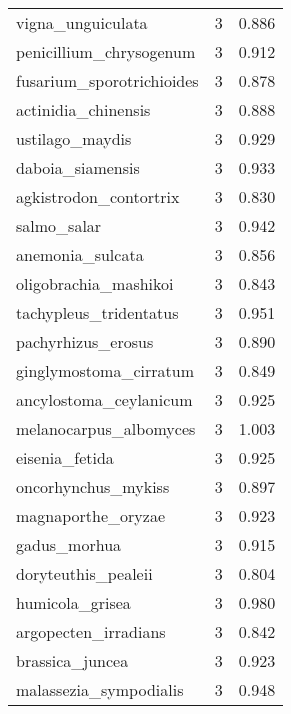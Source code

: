 \begin{tabular}{lrr}
              vigna\_unguiculata &                   3 &     0.886 \\
        penicillium\_chrysogenum &                   3 &     0.912 \\
      fusarium\_sporotrichioides &                   3 &     0.878 \\
            actinidia\_chinensis &                   3 &     0.888 \\
                ustilago\_maydis &                   3 &     0.929 \\
               daboia\_siamensis &                   3 &     0.933 \\
         agkistrodon\_contortrix &                   3 &     0.830 \\
                    salmo\_salar &                   3 &     0.942 \\
               anemonia\_sulcata &                   3 &     0.856 \\
          oligobrachia\_mashikoi &                   3 &     0.843 \\
         tachypleus\_tridentatus &                   3 &     0.951 \\
             pachyrhizus\_erosus &                   3 &     0.890 \\
         ginglymostoma\_cirratum &                   3 &     0.849 \\
         ancylostoma\_ceylanicum &                   3 &     0.925 \\
         melanocarpus\_albomyces &                   3 &     1.003 \\
                 eisenia\_fetida &                   3 &     0.925 \\
            oncorhynchus\_mykiss &                   3 &     0.897 \\
             magnaporthe\_oryzae &                   3 &     0.923 \\
                   gadus\_morhua &                   3 &     0.915 \\
            doryteuthis\_pealeii &                   3 &     0.804 \\
                humicola\_grisea &                   3 &     0.980 \\
           argopecten\_irradians &                   3 &     0.842 \\
                brassica\_juncea &                   3 &     0.923 \\
         malassezia\_sympodialis &                   3 &     0.948 \\

\end{tabular}
